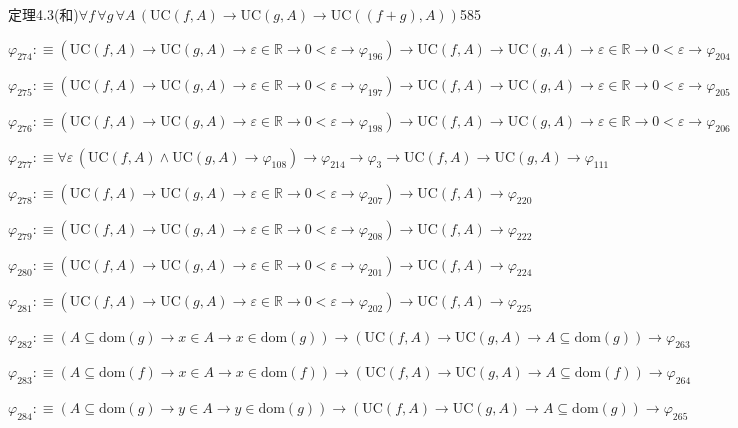 \begin{fullproof}{定理4.3(和)}{$\forall f\,\forall g\,\forall A\,(\mathrm{UC}(f,A) \to \mathrm{UC}(g,A) \to \mathrm{UC}((f + g),A))$}{585}
\begin{abbrevlist}
\item $\varphi_{274} :\equiv (\mathrm{UC}(f,A) \to \mathrm{UC}(g,A) \to \varepsilon \in \mathbb{R} \to 0 < \varepsilon \to \varphi_{196}) \to \mathrm{UC}(f,A) \to \mathrm{UC}(g,A) \to \varepsilon \in \mathbb{R} \to 0 < \varepsilon \to \varphi_{204}$
\item $\varphi_{275} :\equiv (\mathrm{UC}(f,A) \to \mathrm{UC}(g,A) \to \varepsilon \in \mathbb{R} \to 0 < \varepsilon \to \varphi_{197}) \to \mathrm{UC}(f,A) \to \mathrm{UC}(g,A) \to \varepsilon \in \mathbb{R} \to 0 < \varepsilon \to \varphi_{205}$
\item $\varphi_{276} :\equiv (\mathrm{UC}(f,A) \to \mathrm{UC}(g,A) \to \varepsilon \in \mathbb{R} \to 0 < \varepsilon \to \varphi_{198}) \to \mathrm{UC}(f,A) \to \mathrm{UC}(g,A) \to \varepsilon \in \mathbb{R} \to 0 < \varepsilon \to \varphi_{206}$
\item $\varphi_{277} :\equiv \forall \varepsilon\,(\mathrm{UC}(f,A) \land \mathrm{UC}(g,A) \to \varphi_{108}) \to \varphi_{214} \to \varphi_{3} \to \mathrm{UC}(f,A) \to \mathrm{UC}(g,A) \to \varphi_{111}$
\item $\varphi_{278} :\equiv (\mathrm{UC}(f,A) \to \mathrm{UC}(g,A) \to \varepsilon \in \mathbb{R} \to 0 < \varepsilon \to \varphi_{207}) \to \mathrm{UC}(f,A) \to \varphi_{220}$
\item $\varphi_{279} :\equiv (\mathrm{UC}(f,A) \to \mathrm{UC}(g,A) \to \varepsilon \in \mathbb{R} \to 0 < \varepsilon \to \varphi_{208}) \to \mathrm{UC}(f,A) \to \varphi_{222}$
\item $\varphi_{280} :\equiv (\mathrm{UC}(f,A) \to \mathrm{UC}(g,A) \to \varepsilon \in \mathbb{R} \to 0 < \varepsilon \to \varphi_{201}) \to \mathrm{UC}(f,A) \to \varphi_{224}$
\item $\varphi_{281} :\equiv (\mathrm{UC}(f,A) \to \mathrm{UC}(g,A) \to \varepsilon \in \mathbb{R} \to 0 < \varepsilon \to \varphi_{202}) \to \mathrm{UC}(f,A) \to \varphi_{225}$
\item $\varphi_{282} :\equiv (A \subseteq \mathrm{dom}(g) \to x \in A \to x \in \mathrm{dom}(g)) \to (\mathrm{UC}(f,A) \to \mathrm{UC}(g,A) \to A \subseteq \mathrm{dom}(g)) \to \varphi_{263}$
\item $\varphi_{283} :\equiv (A \subseteq \mathrm{dom}(f) \to x \in A \to x \in \mathrm{dom}(f)) \to (\mathrm{UC}(f,A) \to \mathrm{UC}(g,A) \to A \subseteq \mathrm{dom}(f)) \to \varphi_{264}$
\item $\varphi_{284} :\equiv (A \subseteq \mathrm{dom}(g) \to y \in A \to y \in \mathrm{dom}(g)) \to (\mathrm{UC}(f,A) \to \mathrm{UC}(g,A) \to A \subseteq \mathrm{dom}(g)) \to \varphi_{265}$

\end{abbrevlist}
\end{fullproof}

